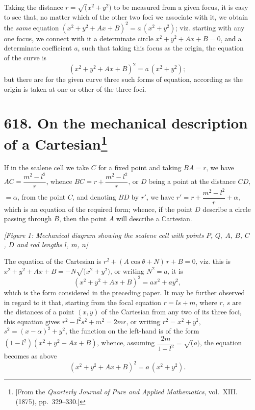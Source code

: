 \documentclass[11pt,a4paper]{book}
\begin{document}
Taking the distance $r = \surd(x^2+y^2)$ to be measured from a given focus, it is easy to see that, no matter which of the other two foci we associate with it, we obtain the \textit{same} equation $(x^2 + y^2 + Ax + B)^2 = a\,(x^2 + y^2)$; viz. starting with any one focus, we connect with it a determinate circle $x^2 + y^2 + Ax + B = 0$, and a determinate coefficient $a$, such that taking this focus as the origin, the equation of the curve is
\[
(x^2 + y^2 + Ax + B)^2 = a\,(x^2 + y^2);
\]
but there are for the given curve three such forms of equation, according as the origin is taken at one or other of the three foci.

\newpage
\section[On the mechanical description of a Cartesian]{\textbf{618.} On the mechanical description of a Cartesian\footnote{[From the \textit{Quarterly Journal of Pure and Applied Mathematics}, vol.~XIII. (1875), pp.~329--330.]}}

If in the scalene cell we take $C$ for a fixed point and taking $BA = r$, we have $AC = \dfrac{m^2-l^2}{r}$, whence $BC = r + \dfrac{m^2-l^2}{r}$, or $D$ being a point at the distance $CD$, $= \alpha$, from the point $C$, and denoting $BD$ by $r'$, we have $r' = r + \dfrac{m^2-l^2}{r} + \alpha$, which is an equation of the required form; whence, if the point $D$ describe a circle passing through $B$, then the point $A$ will describe a Cartesian.

\begin{center}
\textit{[Figure 1: Mechanical diagram showing the scalene cell with points $P$, $Q$, $A$, $B$, $C$, $D$ and rod lengths $l$, $m$, $n$]}
\end{center}

The equation of the Cartesian is $r^2 + (A\cos\theta + N)\,r + B = 0$, viz. this is $x^2 + y^2 + Ax + B = -N\surd(x^2+y^2)$, or writing $N^2 = a$, it is
\[
(x^2 + y^2 + Ax + B)^2 = ax^2 + ay^2,
\]
which is the form considered in the preceding paper. It may be further observed in regard to it that, starting from the focal equation $r = ls + m$, where $r$, $s$ are the distances of a point $(x, y)$ of the Cartesian from any two of its three foci, this equation gives $r^2 - l^2s^2 + m^2 = 2mr$, or writing $r^2 = x^2 + y^2$, $s^2 = (x-\alpha)^2 + y^2$, the function on the left-hand is of the form $(1-l^2)(x^2 + y^2 + Ax + B)$, whence, assuming $\dfrac{2m}{1-l^2} = \surd(a)$, the equation becomes as above
\[
(x^2 + y^2 + Ax + B)^2 = a\,(x^2 + y^2).
\]
\end{document}
